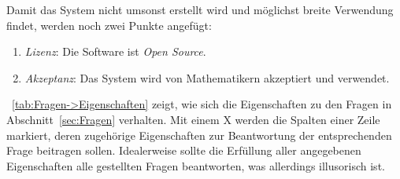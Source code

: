 \documentclass[english,ngerman,parskip=half,headsepline,footsepline]{scrreprt}
\newcounter{Enumi}%
\newcommand*{\sectionname}{Abschnitt}
\begin{document}
	Damit das System nicht umsonst erstellt wird und möglichst breite Verwendung findet, werden noch zwei Punkte angefügt:

	\begin{enumerate}
		\setcounter{enumi}{\value{Enumi}}

		\item \label{Eigenschaft:Lizenz} \emph{Lizenz}: Die Software ist \emph{Open Source}.

		\item \label{Eigenschaft:Akzeptanz} \emph{Akzeptanz}: Das System wird von Mathematikern akzeptiert und verwendet.

	\end{enumerate}

	\tablename~\vref{tab:Fragen->Eigenschaften} zeigt, wie sich die Eigenschaften zu den Fragen in \sectionname~\vref{sec:Fragen} verhalten.
	Mit einem X werden die Spalten einer Zeile markiert, deren zugehörige Eigenschaften zur Beantwortung der entsprechenden Frage beitragen sollen.
	Idealerweise sollte die Erfüllung aller angegebenen Eigenschaften alle gestellten Fragen beantworten, was allerdings illusorisch ist.

	\newcommand*{\vsll}{\hspace{-1.0cm}}
	\newcommand*{\vsl}{\hspace{-6pt}\vsll}
	\newcommand*{\vsc}{\hspace{6pt}}
\end{document}
